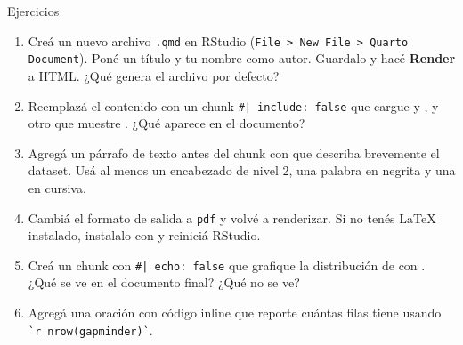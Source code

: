 \documentclass[8pt]{beamer}
\begin{document}
	\begin{frame}[fragile]{Ejercicios}
		\begin{enumerate}
			\item Creá un nuevo archivo \texttt{.qmd} en RStudio (\verb|File > New File > Quarto Document|). Poné un título y tu nombre como autor. Guardalo y hacé \textbf{Render} a HTML. ¿Qué genera el archivo por defecto?

			\item Reemplazá el contenido con un chunk \texttt{\#| include: false} que cargue  y , y otro que muestre . ¿Qué aparece en el documento?

			\item Agregá un párrafo de texto antes del chunk con  que describa brevemente el dataset. Usá al menos un encabezado de nivel 2, una palabra en negrita y una en cursiva.

			\item Cambiá el formato de salida a \texttt{pdf} y volvé a renderizar. Si no tenés \LaTeX{} instalado, instalalo con  y reiniciá RStudio.

			\item Creá un chunk con \texttt{\#| echo: false} que grafique la distribución de  con . ¿Qué se ve en el documento final? ¿Qué no se ve?

			\item Agregá una oración con código inline que reporte cuántas filas tiene  usando \verb|`r nrow(gapminder)`|.
		\end{enumerate}
	\end{frame}
\end{document}

